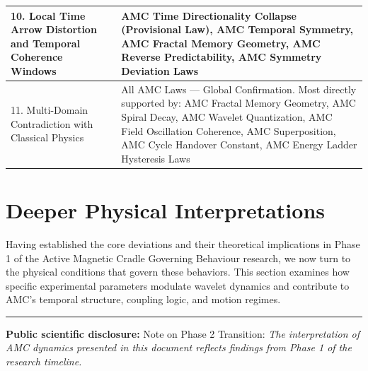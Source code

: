 \documentclass[10pt,aps,pre,onecolumn,superscriptaddress,notitlepage]{revtex4-2}
\begin{document}
\begin{center}
\begin{tabular}{|p{5cm}|p{10cm}|}
    \hline
    10. Local Time Arrow Distortion and Temporal Coherence Windows & AMC Time Directionality Collapse (Provisional Law), AMC Temporal Symmetry, AMC Fractal Memory Geometry, AMC Reverse Predictability, AMC Symmetry Deviation Laws \\
    \hline
    11. Multi-Domain Contradiction with Classical Physics & All AMC Laws --- Global Confirmation. Most directly supported by: AMC Fractal Memory Geometry, AMC Spiral Decay, AMC Wavelet Quantization, AMC Field Oscillation Coherence, AMC Superposition, AMC Cycle Handover Constant, AMC Energy Ladder Hysteresis Laws \\
    \hline
  \end{tabular}
\end{center}

\vspace{1cm} %


\clearpage
\section{Deeper Physical Interpretations}
\label{sec:Interpretations}

Having established the core deviations and their theoretical implications in Phase 1 of the Active Magnetic Cradle Governing Behaviour research, we now turn to the physical conditions that govern these behaviors. This section examines how specific experimental parameters modulate wavelet dynamics and contribute to AMC’s temporal structure, coupling logic, and motion regimes.

\vspace{1em}
\hrule
\vspace{1em}

\textbf{Public scientific disclosure:}
Note on Phase 2 Transition: \textit{The interpretation of AMC dynamics presented in this document reflects findings from Phase 1 of the research timeline. 
}
\end{document}
